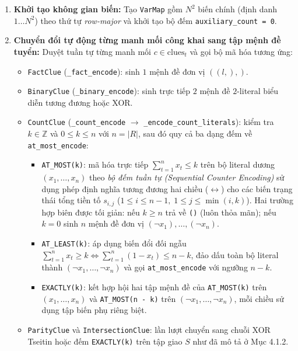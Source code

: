 \documentclass[12pt,a4paper]{article}
\begin{document}
\begin{enumerate}
    \item \textbf{Khởi tạo không gian biến:} Tạo \texttt{VarMap} gồm $N^2$ biến chính (định danh $1 \dots N^2$) theo thứ tự \emph{row-major} và khởi tạo bộ đếm \texttt{auxiliary\_count = 0}.
    \item \textbf{Chuyển đổi tự động từng manh mối công khai sang tập mệnh đề tuyển:} Duyệt tuần tự từng manh mối $c \in \text{clues}_t$ và gọi bộ mã hóa tương ứng:
    \begin{itemize}
        \item \texttt{FactClue} (\texttt{\_fact\_encode}): sinh $1$ mệnh đề đơn vị $((l,),)$.
        \item \texttt{BinaryClue} (\texttt{\_binary\_encode}): sinh trực tiếp $2$ mệnh đề $2$-literal biểu diễn tương đương hoặc XOR.
        \item \texttt{CountClue} (\texttt{\_count\_encode} $\to$ \texttt{\_encode\_count\_literals}): kiểm tra $k \in \mathbb{Z}$ và $0 \le k \le n$ với $n = |R|$, sau đó quy cả ba dạng đếm về \texttt{at\_most\_encode}:
        \begin{itemize}
            \item \texttt{AT\_MOST(k)}: mã hóa trực tiếp $\sum_{t=1}^{n} x_t \le k$ trên bộ literal dương $(x_1, \dots, x_n)$ theo \emph{bộ đếm tuần tự (Sequential Counter Encoding)} sử dụng phép định nghĩa tương đương hai chiều ($\leftrightarrow$) cho các biến trạng thái tổng tiền tố $s_{i,j}$ ($1 \le i \le n - 1,\; 1 \le j \le \min(i, k)$). Hai trường hợp biên được tối giản: nếu $k \ge n$ trả về \texttt{()} (luôn thỏa mãn); nếu $k = 0$ sinh $n$ mệnh đề đơn vị $(\neg x_1), \dots, (\neg x_n)$.
            \item \texttt{AT\_LEAST(k)}: áp dụng biến đổi đối ngẫu $\sum_{t=1}^{n} x_t \ge k \iff \sum_{t=1}^{n} (1 - x_t) \le n - k$, đảo dấu toàn bộ literal thành $(\neg x_1, \dots, \neg x_n)$ và gọi \texttt{at\_most\_encode} với ngưỡng $n - k$.
            \item \texttt{EXACTLY(k)}: kết hợp hội hai tập mệnh đề của \texttt{AT\_MOST(k)} trên $(x_1, \dots, x_n)$ và \texttt{AT\_MOST(n - k)} trên $(\neg x_1, \dots, \neg x_n)$, mỗi chiều sử dụng tập biến phụ riêng biệt.
        \end{itemize}
        \item \texttt{ParityClue} và \texttt{IntersectionClue}: lần lượt chuyển sang chuỗi XOR Tseitin hoặc đếm \texttt{EXACTLY(k)} trên tập giao $S$ như đã mô tả ở Mục 4.1.2.
    \end{itemize}

\end{enumerate}
\end{document}
